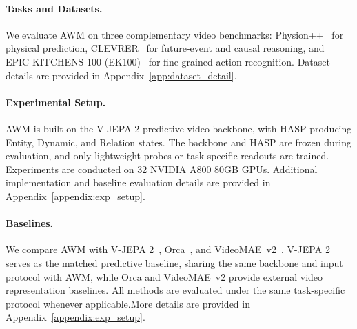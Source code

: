 \documentclass{article}
\begin{document}
\paragraph{Tasks and Datasets.}
We evaluate AWM on three complementary video benchmarks: Physion++~\citep{bear2021physion} for physical prediction, CLEVRER~\citep{yi2020clevrer} for future-event and causal reasoning, and EPIC-KITCHENS-100 (EK100)~\citep{damend2022epic} for fine-grained action recognition. Dataset details are provided in Appendix~\ref{app:dataset_detail}.

\paragraph{Experimental Setup.}
AWM is built on the V-JEPA 2 predictive video backbone, with HASP producing Entity, Dynamic, and Relation states. The backbone and HASP are frozen during evaluation, and only lightweight probes or task-specific readouts are trained. 
Experiments are conducted on 32 NVIDIA A800 80GB GPUs. Additional implementation and baseline evaluation details are provided in Appendix~\ref{appendix:exp_setup}.

\paragraph{Baselines.}
We compare AWM with V-JEPA 2~\citep{assran2025vjepa2}, Orca~\citep{wang2026orca}, and VideoMAE~v2~\citep{wang2023videomaev2}. V-JEPA 2 serves as the matched predictive baseline, sharing the same backbone and input protocol with AWM, while Orca and VideoMAE~v2 provide external video representation baselines. All methods are evaluated under the same task-specific protocol whenever applicable.More details are provided in Appendix~\ref{appendix:exp_setup}.

\end{document}
